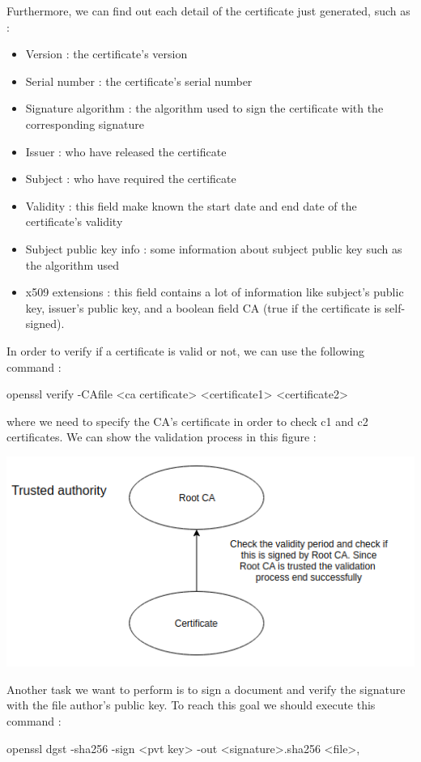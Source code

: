 \documentclass[11pt]{article}
\begin{document}
Furthermore, we can find out each detail of the certificate just generated, such as :
\begin{itemize}
\item Version : the certificate's version
\item Serial number : the certificate's serial number
\item Signature algorithm : the algorithm used to sign the certificate with the corresponding signature
\item Issuer : who have released the certificate
\item Subject : who have required the certificate
\item Validity : this field make known the start date and end date of the certificate's validity
\item Subject public key info : some information about subject public key such as the algorithm used
\item x509 extensions : this field contains a lot of information like subject's public key, issuer's public key, and a boolean field CA (true if the certificate is self-signed).
\end{itemize}
In order to verify if a certificate is valid or not, we can use the following command :
\begin{center}
openssl verify -CAfile <ca certificate> <certificate1> <certificate2>
\end{center}
where we need to specify the CA's certificate in order to check c1 and c2 certificates. We can show the validation process in this figure :
\begin{center}
\includegraphics[scale=0.5]{./verification_process.png}
\end{center}
Another task we want to perform is to sign a document and verify the signature with the file author's public key. To reach this goal we should execute this command :
\begin{center}
openssl dgst -sha256 -sign <pvt key> -out <signature>.sha256 <file>,
\end{center}
\end{document}

